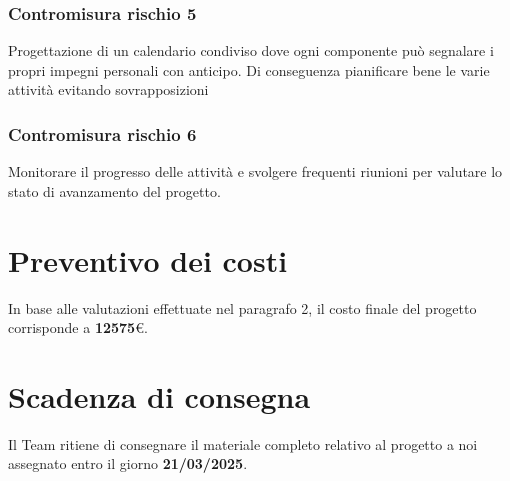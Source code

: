 \documentclass{article}
\begin{document}
\subsubsection{Contromisura rischio 5}
Progettazione di un calendario condiviso dove ogni componente può segnalare i propri impegni personali con anticipo. Di conseguenza pianificare bene le varie attività evitando sovrapposizioni
\subsubsection{Contromisura rischio 6}
Monitorare il progresso delle attività e svolgere frequenti riunioni per valutare lo stato di avanzamento del progetto. 

\newpage
\section{Preventivo dei costi}
In base alle valutazioni effettuate nel paragrafo 2, il costo finale del progetto corrisponde a \textbf{12575}€.

\section{Scadenza di consegna}
Il Team ritiene di consegnare il materiale completo relativo al progetto a noi assegnato entro il giorno \textbf{21/03/2025}.
\end{document}

